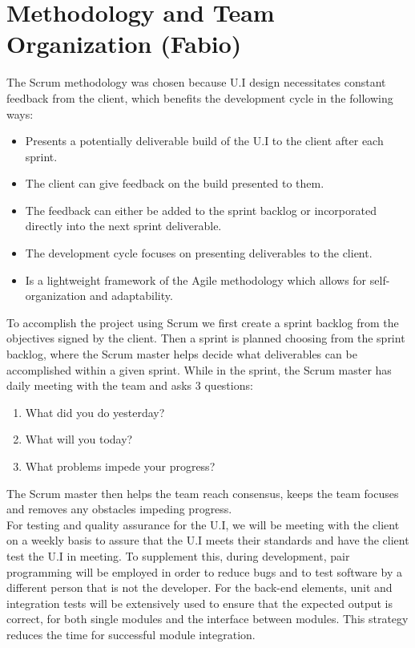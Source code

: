 \section{Methodology and Team Organization (Fabio)}
 The Scrum methodology was chosen because U.I design necessitates constant feedback from the client, which benefits the development cycle in the following ways:\cite{scrumallianceWhatScrum2015}
 \begin{itemize}
 \item Presents a potentially deliverable build of the U.I to the client after each sprint.
 \item The client can give feedback on the build presented to them.
 \item The feedback can either be added to the sprint backlog or incorporated directly into the next sprint deliverable.
 \item The development cycle focuses on presenting deliverables to the client.
 \item Is a lightweight framework of the Agile methodology which allows for self-organization and adaptability.
 \end{itemize}
 To accomplish the project using Scrum we first create a sprint backlog from the objectives signed by the client.\cite{scrumallianceWhatScrum2015} Then a sprint is planned choosing from the sprint backlog, where the Scrum master helps decide what deliverables can be accomplished within a given sprint.\cite{scrumallianceWhatScrum2015}\cite{eyeontechWhatScrumMaster2020} While in the sprint, the Scrum master has daily meeting with the team and asks 3 questions:\cite{eyeontechWhatScrumMaster2020}
 \begin{enumerate}
 \item What did you do yesterday?
 \item What will you today?
 \item What problems impede your progress?
 \end{enumerate}
 The Scrum master then helps the team reach consensus, keeps the team focuses and removes any obstacles impeding progress.\cite{eyeontechWhatScrumMaster2020}\\
 For testing and quality assurance for the U.I, we will be meeting with the client on a weekly basis to assure that the U.I meets their standards and have the client test the U.I in meeting. To supplement this, during development, pair programming will be employed in order to reduce bugs and to test software by a different person that is not the developer. For the back-end elements, unit and integration tests will be extensively used to ensure that the expected output is correct, for both single modules and the interface between modules. This strategy reduces the time for successful module integration.\\
